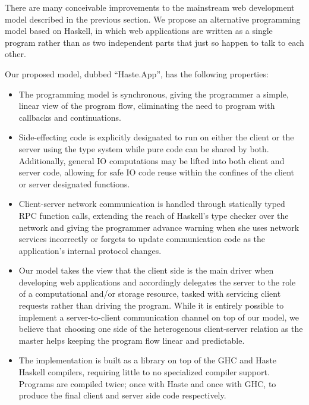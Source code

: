 \documentclass[preprint]{sigplanconf}
\begin{document}
There are many conceivable improvements to the mainstream web development model
described in the previous section. We propose an alternative programming model
based on Haskell, in which web applications are written as a single program
rather than as two independent parts that just so happen to talk to each other.

Our proposed model, dubbed ``Haste.App'', has the following properties:

\begin{itemize}
  \item The programming model is synchronous, giving the programmer a simple,
        linear view of the program flow, eliminating the need to program with
        callbacks and continuations.
  \item Side-effecting code is explicitly designated to run on either the
        client or the server using the type system while pure code can be
        shared by both. Additionally, general IO computations may be lifted
        into both client and server code, allowing for safe IO code reuse
        within the confines of the client or server designated functions.
  \item Client-server network communication is handled through statically typed
        RPC function calls, extending the reach of Haskell's type checker over
        the network and giving the programmer advance warning when she uses
        network services incorrectly or forgets to update communication code
        as the application's internal protocol changes.
  \item Our model takes the view that the client side is the main driver when
        developing web applications and accordingly delegates the server to
        the role of a computational and/or storage resource, tasked with
        servicing client requests rather than driving the program. While it is
        entirely possible to implement a server-to-client communication channel
        on top of our model, we believe that choosing one side of the
        heterogenous client-server relation as the master helps keeping the
        program flow linear and predictable.
  \item The implementation is built as a library on top of the GHC and Haste
        Haskell compilers, requiring little to no specialized compiler support.
        Programs are compiled twice; once with Haste and once with GHC, to
        produce the final client and server side code respectively.
\end{itemize}
\end{document}
